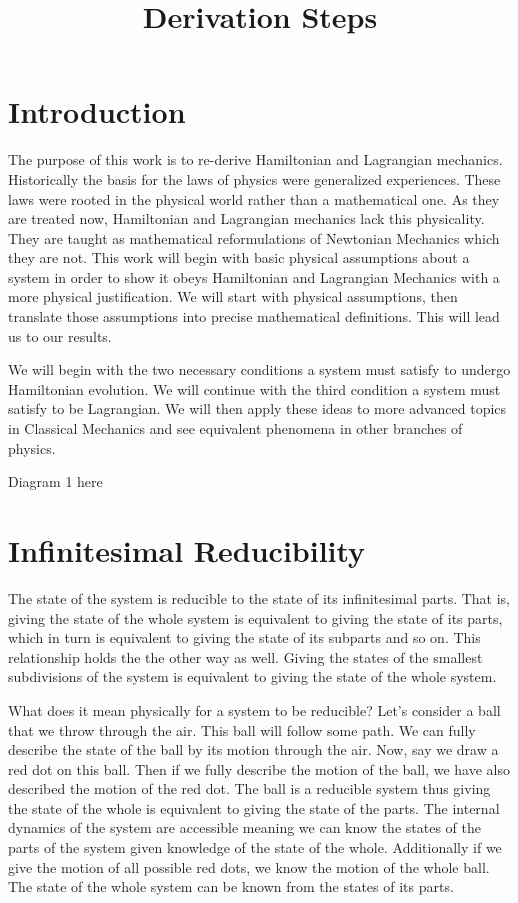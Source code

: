 \documentclass{article}
\begin{document}
\title{Derivation Steps}

\section{Introduction}

	The purpose of this work is to re-derive Hamiltonian and Lagrangian mechanics. Historically the basis for the laws of physics were generalized experiences. These laws were rooted in the physical world rather than a mathematical one. As they are treated now, Hamiltonian and Lagrangian mechanics lack this physicality. They are taught as mathematical reformulations of Newtonian Mechanics which they are not. This work will begin with basic physical assumptions about a system in order to show it obeys Hamiltonian and Lagrangian Mechanics with a more physical justification. We will start with physical assumptions, then translate those assumptions into precise mathematical definitions. This will lead us to our results. 
	
	We will begin with the two necessary conditions a system must satisfy to undergo Hamiltonian evolution. We will continue with the third condition a system must satisfy to be Lagrangian. We will then apply these ideas to more advanced topics in Classical Mechanics and see equivalent phenomena in other branches of physics.	
	
Diagram 1 here

\section{Infinitesimal Reducibility}
	
\begin{assump}
	The state of the system is reducible to the state of its infinitesimal parts. That is, giving the state of the whole system is equivalent to giving the state of its parts, which in turn is equivalent to giving the state of its subparts and so on. This relationship holds the the other way as well. Giving the states of the smallest subdivisions of the system is equivalent to giving the state of the whole system.
\end{assump}
	
	
	What does it mean physically for a system to be reducible? Let's consider a ball that we throw through the air. This ball will follow some path. We can fully describe the state of the ball by its motion through the air. Now, say we draw a red dot on this ball. Then if we fully describe the motion of the ball, we have also described the motion of the red dot. The ball is a reducible system thus giving the state of the whole is equivalent to giving the state of the parts. The internal dynamics of the system are accessible meaning we can know the states of the parts of the system given knowledge of the state of the whole. Additionally if we give the motion of all possible red dots, we know the motion of the whole ball. The state of the whole system can be known from the states of its parts. 
	
\end{document}
